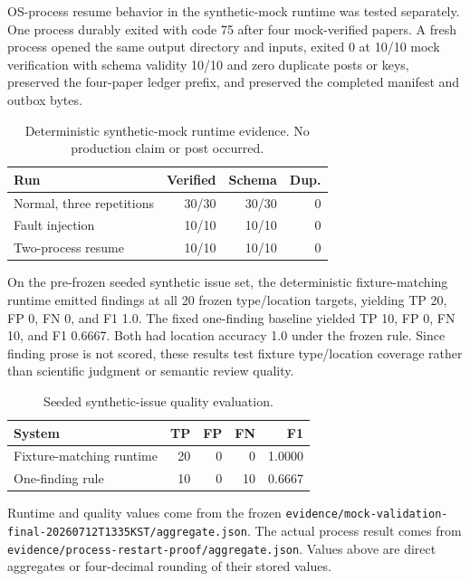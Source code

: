 \documentclass{article}
\begin{document}
OS-process resume behavior in the synthetic-mock runtime was tested separately.
One process durably exited with code 75 after four mock-verified papers. A fresh
process opened the same output directory and inputs, exited 0 at 10/10 mock
verification with schema validity 10/10 and zero duplicate posts or keys,
preserved the four-paper ledger prefix, and preserved the completed manifest
and outbox bytes.

\begin{table}[t]
  \caption{Deterministic synthetic-mock runtime evidence. No production claim
  or post occurred.}
  \label{tab:runtime}
  \centering
  \small
  \begin{tabular}{@{}lrrr@{}}
    \toprule
    Run & Verified & Schema & Dup. \\
    \midrule
    Normal, three repetitions & 30/30 & 30/30 & 0 \\
    Fault injection & 10/10 & 10/10 & 0 \\
    Two-process resume & 10/10 & 10/10 & 0 \\
    \bottomrule
  \end{tabular}
\end{table}

On the pre-frozen seeded synthetic issue set, the deterministic
fixture-matching runtime emitted findings at all 20 frozen type/location
targets, yielding TP 20, FP 0, FN 0, and F1 1.0. The fixed one-finding baseline
yielded TP 10, FP 0, FN 10, and F1 0.6667. Both had location accuracy 1.0 under
the frozen rule. Since finding prose is not scored, these results test fixture
type/location coverage rather than scientific judgment or semantic review
quality.

\begin{table}[t]
  \caption{Seeded synthetic-issue quality evaluation.}
  \label{tab:quality}
  \centering
  \small
  \begin{tabular}{@{}lrrrr@{}}
    \toprule
    System & TP & FP & FN & F1 \\
    \midrule
    Fixture-matching runtime & 20 & 0 & 0 & 1.0000 \\
    One-finding rule & 10 & 0 & 10 & 0.6667 \\
    \bottomrule
  \end{tabular}
\end{table}

Runtime and quality values come from the frozen
\nolinkurl{evidence/mock-validation-final-20260712T1335KST/aggregate.json}.
The actual process result comes from
\nolinkurl{evidence/process-restart-proof/aggregate.json}. Values above are
direct aggregates or four-decimal rounding of their stored values.
\end{document}

